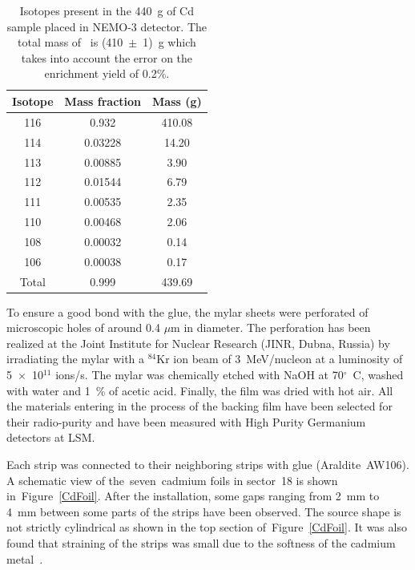 \documentclass[main.tex]{subfiles}
\begin{document}
\begin{table}[h!]
\begin{center}
\begin{tabular}{c|c|c}
\toprule
Isotope & Mass fraction & Mass (g) \\
\hline
116   & 0.932   & 410.08 \\[0.05cm]
114   & 0.03228 & 14.20  \\[0.05cm]
113   & 0.00885 & 3.90   \\[0.05cm]
112   & 0.01544 & 6.79   \\[0.05cm]
111   & 0.00535 & 2.35   \\[0.05cm]
110   & 0.00468 & 2.06   \\[0.05cm]
108   & 0.00032 & 0.14   \\[0.05cm]
106   & 0.00038 & 0.17   \\[0.05cm]
Total & 0.999   & 439.69 \\[0.05cm]
\bottomrule
\end{tabular}
\end{center}
\caption{Isotopes present in the 440~g of Cd sample placed in NEMO-3 detector. The total mass of \Cd~is (410~$\pm$~1)~g which takes into account the error on the enrichment yield of 0.2\%.}
\label{tab:IsotopeCdTable}
\end{table}


\bigskip


\NI To ensure a good bond with the glue, the mylar sheets were perforated of microscopic holes of around 0.4 $\mu$m in diameter. The perforation has been realized at the Joint Institute for Nuclear Research (JINR, Dubna, Russia) by irradiating the mylar with a $^{\text{84}}$Kr ion beam of 3~MeV/nucleon at a luminosity of 5~$\times$~10$^{\text{11}}$ ions/s. The mylar was chemically etched with NaOH at 70$^{\circ}$~C, washed with water and 1~\% of acetic acid. Finally, the film was dried with hot air. All the materials entering in the process of the backing film have been selected for their radio-purity and have been measured with High Purity Germanium detectors at LSM.


\bigskip


\NI Each strip was connected to their neighboring strips with glue (Araldite~AW106). A schematic view of the~seven~cadmium foils in sector~18 is shown in~Figure~\ref{CdFoil}. After the installation, some gaps ranging from 2~mm to 4~mm between some parts of the strips have been observed. The source shape is not strictly cylindrical as shown in the top section of~Figure~\ref{CdFoil}. It was also found that straining of the strips was small due to the softness of the cadmium metal~\cite{SoftnessCdMetal}. 
\end{document}
